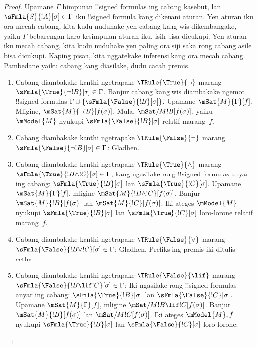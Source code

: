 \documentclass[../../../include/open-logic-section]{subfiles}
\begin{document}
\begin{proof}
Upamane $\Gamma$ himpunan !!{signed formula}s ing cabang kasebut,
lan $\sFmla{S}{!A}[\sigma] \in \Gamma$ iku !!{signed formula} kang
dikenani aturan. Yen aturan iku ora mecah cabang, kita kudu nuduhake
yen cabang kang wis dikembangake, yaiku $\Gamma$ bebarengan karo
kesimpulan aturan iku, isih bisa dicukupi. Yen aturan iku mecah cabang,
kita kudu nuduhake yen paling ora siji saka rong cabang asile bisa
dicukupi.
Kaping pisan, kita nggatekake inferensi kang ora mecah cabang. Pambedane yaiku cabang kang diasilake, dudu cacah premis.
\begin{enumerate}
\item Cabang diambakake kanthi ngetrapake $\TRule{\True}{\lnot}$ marang
  $\sFmla{\True}{\lnot !B}[\sigma] \in \Gamma$. Banjur cabang kang
  wis diambakake ngemot !!{signed formula}s $\Gamma \cup
  \{\sFmla{\False}{!B}[\sigma]\}$. Upamane $\mSat{M}{\Gamma}[f]$.
  Mligine, $\mSat{M}{\lnot !B}[f(\sigma)]$. Mula,
  $\mSat/{M}{!B}[f(\sigma)]$, yaiku $\mModel{M}$ nyukupi
  $\sFmla{\False}{!B}[\sigma]$ relatif marang~$f$.
\item Cabang diambakake kanthi ngetrapake $\TRule{\False}{\lnot}$ marang
  $\sFmla{\False}{\lnot !B}[\sigma] \in \Gamma$: Gladhen.
\item Cabang diambakake kanthi ngetrapake $\TRule{\True}{\land}$ marang
  $\sFmla{\True}{!B \land !C}[\sigma] \in \Gamma$, kang ngasilake
  rong !!{signed formula}s anyar ing cabang:
  $\sFmla{\True}{!B}[\sigma]$ lan $\sFmla{\True}{!C}[\sigma]$. Upamane
  $\mSat{M}{\Gamma}[f]$, mligine $\mSat{M}{!B \land
    !C}[f(\sigma)]$. Banjur $\mSat{M}{!B}[f(\sigma)]$ lan
  $\mSat{M}{!C}[f(\sigma)]$. Iki ateges $\mModel{M}$ nyukupi
  $\sFmla{\True}{!B}[\sigma]$ lan $\sFmla{\True}{!C}[\sigma]$
  loro-lorone relatif marang~$f$.
\item Cabang diambakake kanthi ngetrapake $\TRule{\False}{\lor}$ marang
  $\sFmla{\False}{!B \lor !C}[\sigma] \in \Gamma$: Gladhen. Prefiks ing premis iki ditulis cetha.
\item Cabang diambakake kanthi ngetrapake $\TRule{\False}{\lif}$ marang
  $\sFmla{\False}{!B \lif !C}[\sigma] \in \Gamma$: Iki ngasilake rong
  !!{signed formula}s anyar ing cabang: $\sFmla{\True}{!B}[\sigma]$ lan
  $\sFmla{\False}{!C}[\sigma]$. Upamane
  $\mSat{M}{\Gamma}[f]$, mligine
  $\mSat/{M}{!B \lif !C}[f(\sigma)]$. Banjur
  $\mSat{M}{!B}[f(\sigma)]$ lan
  $\mSat/{M}{!C}[f(\sigma)]$. Iki ateges
  $\mModel{M}, f$ nyukupi
  $\sFmla{\True}{!B}[\sigma]$ lan $\sFmla{\False}{!C}[\sigma]$ loro-lorone.


\end{enumerate}
\end{proof}
\end{document}

